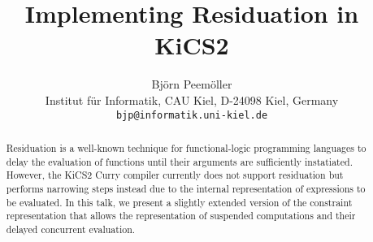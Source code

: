 \documentclass{scrartcl}
\title{Implementing Residuation in KiCS2}
\author{%
Bj{\"o}rn Peem{\"o}ller \\
Institut f{\"u}r Informatik, CAU Kiel, D-24098 Kiel, Germany \\
\texttt{bjp@informatik.uni-kiel.de}
}
\date{}
\begin{document}
\maketitle
\thispagestyle{empty}

\begin{abstract}
Residuation is a well-known technique for functional-logic programming
languages to delay the evaluation of functions until their arguments are
sufficiently instatiated.
However, the KiCS2 Curry compiler currently does not support residuation
but performs narrowing steps instead due to the internal representation
of expressions to be evaluated.
In this talk, we present a slightly extended version of the
constraint representation that allows the representation
of suspended computations and their delayed concurrent evaluation.
\end{abstract}
\end{document}
